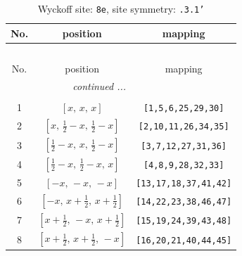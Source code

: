 \documentclass[fleqn,8pt]{jsarticle}
\begin{document}
\renewcommand{\arraystretch}{1.2}
\begin{longtable}{ccc}
\caption{Wyckoff site: {\tt 8e}, site symmetry: {\tt .3.1'}}
 \\
 \hline \hline
No. & position & mapping \\ \hline \endfirsthead

\multicolumn{2}{l}{\tablename\ \thetable{}} \\
 \hline \hline
No. & position & mapping \\ \hline \endhead

 \hline \hline
\multicolumn{2}{r}{\footnotesize\it continued ...} \\ \endfoot

 \hline \hline
\multicolumn{2}{r}{} \\ \endlastfoot

1 & $\left[ x,\, x,\, x \right]$ & {\tt [1,5,6,25,29,30]} \\ \hline
2 & $\left[ x,\, \frac{1}{2} - x,\, \frac{1}{2} - x \right]$ & {\tt [2,10,11,26,34,35]} \\ \hline
3 & $\left[ \frac{1}{2} - x,\, x,\, \frac{1}{2} - x \right]$ & {\tt [3,7,12,27,31,36]} \\ \hline
4 & $\left[ \frac{1}{2} - x,\, \frac{1}{2} - x,\, x \right]$ & {\tt [4,8,9,28,32,33]} \\ \hline
5 & $\left[ - x,\, - x,\, - x \right]$ & {\tt [13,17,18,37,41,42]} \\ \hline
6 & $\left[ - x,\, x + \frac{1}{2},\, x + \frac{1}{2} \right]$ & {\tt [14,22,23,38,46,47]} \\ \hline
7 & $\left[ x + \frac{1}{2},\, - x,\, x + \frac{1}{2} \right]$ & {\tt [15,19,24,39,43,48]} \\ \hline
8 & $\left[ x + \frac{1}{2},\, x + \frac{1}{2},\, - x \right]$ & {\tt [16,20,21,40,44,45]} \\
\end{longtable}
\renewcommand{\arraystretch}{1.2}
\end{document}
